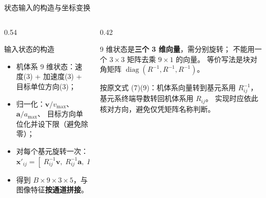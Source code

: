 \begin{frame}{状态输入的构造与坐标变换}
  \small
  \begin{columns}[t]
    \begin{column}{0.54\textwidth}
      \begin{block}{输入状态的构造}
        \footnotesize
        \begin{itemize}\tight
          \item 机体系 9 维状态：速度(3) + 加速度(3) + 目标单位方向(3)；
          \item 归一化：$\mathbf v/v_{\max}$、$\mathbf a/a_{\max}$、
                目标方向单位化并设下限（避免除零）；
          \item 对每个基元旋转一次：
                $\mathbf x'_{ij}=[\;R_{ij}^{-1}\mathbf v,\;R_{ij}^{-1}\mathbf a,\;R_{ij}^{-1}\hat{\mathbf g}\;]$
          \item 得到 $B\times9\times3\times5$，与图像特征\textbf{按通道拼接}。
        \end{itemize}
      \end{block}
    \end{column}
    \begin{column}{0.42\textwidth}
      \begin{reading}[实现上的常见错误]
        \small
        9 维状态是\textbf{三个 3 维向量}，需分别旋转；
        不能用一个 $3\times3$ 矩阵去乘 $9\times1$ 的向量。
        等价写法是块对角矩阵
        $\operatorname{diag}(R^{-1},R^{-1},R^{-1})$。
      \end{reading}
      \begin{reading}[方向约定]
        \scriptsize
        按原文式 (7)(9)：机体系向量转到基元系用 $R_{ij}^{-1}$，
        基元系终端导数转回机体系用 $R_{ij}$。
        实现时应依此核对方向，避免仅凭矩阵名称判断。
      \end{reading}
    \end{column}
  \end{columns}
\end{frame}

